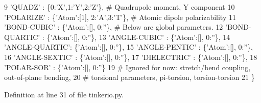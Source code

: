 \begin{DoxyCode}
9          \textcolor{stringliteral}{'QUADZ'}        : \{0:\textcolor{stringliteral}{'X'},1:\textcolor{stringliteral}{'Y'},2:\textcolor{stringliteral}{'Z'}\},             \textcolor{comment}{# Quadrupole moment, Y component}
10          \textcolor{stringliteral}{'POLARIZE'}     : \{\textcolor{stringliteral}{'Atom'}:[1], 2:\textcolor{stringliteral}{'A'},3:\textcolor{stringliteral}{'T'}\},       \textcolor{comment}{# Atomic dipole polarizability}
11          \textcolor{stringliteral}{'BOND-CUBIC'}   : \{\textcolor{stringliteral}{'Atom'}:[], 0:\textcolor{stringliteral}{''}\},    \textcolor{comment}{# Below are global parameters.}
12          \textcolor{stringliteral}{'BOND-QUARTIC'} : \{\textcolor{stringliteral}{'Atom'}:[], 0:\textcolor{stringliteral}{''}\},
13          \textcolor{stringliteral}{'ANGLE-CUBIC'}  : \{\textcolor{stringliteral}{'Atom'}:[], 0:\textcolor{stringliteral}{''}\},
14          \textcolor{stringliteral}{'ANGLE-QUARTIC'}: \{\textcolor{stringliteral}{'Atom'}:[], 0:\textcolor{stringliteral}{''}\},
15          \textcolor{stringliteral}{'ANGLE-PENTIC'} : \{\textcolor{stringliteral}{'Atom'}:[], 0:\textcolor{stringliteral}{''}\},
16          \textcolor{stringliteral}{'ANGLE-SEXTIC'} : \{\textcolor{stringliteral}{'Atom'}:[], 0:\textcolor{stringliteral}{''}\},
17          \textcolor{stringliteral}{'DIELECTRIC'}   : \{\textcolor{stringliteral}{'Atom'}:[], 0:\textcolor{stringliteral}{''}\},
18          \textcolor{stringliteral}{'POLAR-SOR'}    : \{\textcolor{stringliteral}{'Atom'}:[], 0:\textcolor{stringliteral}{''}\}
19                                                 \textcolor{comment}{# Ignored for now: stretch/bend coupling, out-of-plane
       bending,}
20                                                 \textcolor{comment}{# torsional parameters, pi-torsion, torsion-torsion}
21          \}
\end{DoxyCode}


Definition at line 31 of file tinkerio.\-py.

